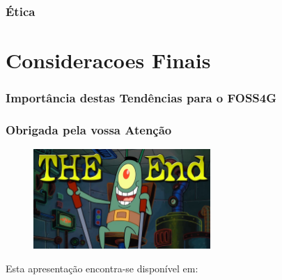 \documentclass[hyperref={pdfpagelabels=true}]{beamer}
\begin{document}
\begin{frame}
\frametitle{\'{E}tica}


\end{frame}

\section{Consideracoes Finais} 

\begin{frame}
\frametitle{Import\^{a}ncia destas Tend\^{e}ncias para o FOSS4G}





\end{frame}




\begin{frame}
\frametitle{Obrigada pela vossa Aten\c{c}\~{a}o}
    \begin{figure}   
      \includegraphics[width=0.6\textwidth]{end.jpg}      
    \end{figure}   
    Esta apresenta\c{c}\~{a}o encontra-se dispon\'{i}vel em: 
      \vspace{5mm}    
\end{frame}
\end{document}
